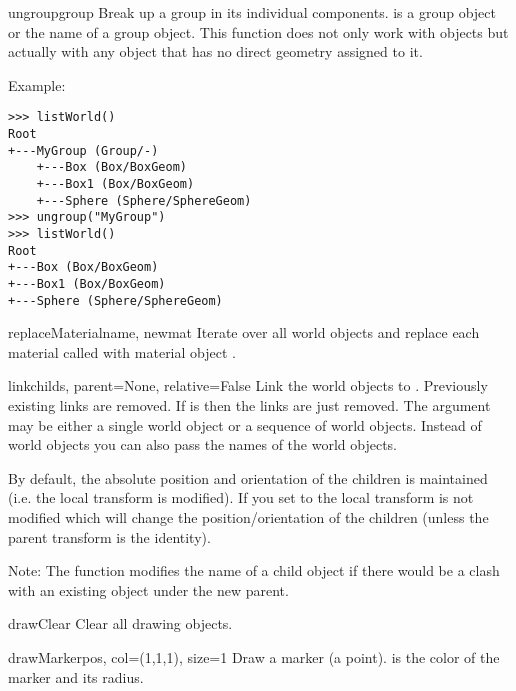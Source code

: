 \begin{funcdesc}{ungroup}{group}
Break up a group in its individual components.  is a group
object or the name of a group object. This function does not only work
with  objects but actually with any object that has no direct
geometry assigned to it.

Example:

\begin{verbatim}
>>> listWorld()
Root
+---MyGroup (Group/-)
    +---Box (Box/BoxGeom)
    +---Box1 (Box/BoxGeom)
    +---Sphere (Sphere/SphereGeom)
>>> ungroup("MyGroup")
>>> listWorld()
Root
+---Box (Box/BoxGeom)
+---Box1 (Box/BoxGeom)
+---Sphere (Sphere/SphereGeom)
\end{verbatim}
\end{funcdesc}

\begin{funcdesc}{replaceMaterial}{name, newmat}
Iterate over all world objects and replace each material called 
with material object . 
\end{funcdesc}

\begin{funcdesc}{link}{childs, parent=None, relative=False}
Link the world objects  to . Previously existing
links are removed. If  is  then the links are just
removed. The argument  may be either a single world object or
a sequence of world objects. Instead of world objects you can also pass
the names of the world objects.

By default, the absolute position and orientation of the children is
maintained (i.e. the local transform is modified). If you set 
to  the local transform is not modified which will change the
position/orientation of the children (unless the parent transform is the
identity).

Note: The function modifies the name of a child object if there would
be a clash with an existing object under the new parent.
\end{funcdesc}

\begin{funcdesc}{drawClear}{}
Clear all drawing objects.
\end{funcdesc}

\begin{funcdesc}{drawMarker}{pos, col=(1,1,1), size=1}
Draw a marker (a point).  is the color of the marker and
 its radius.
\end{funcdesc}

